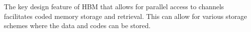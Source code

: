 The key design feature of HBM that allows for parallel access to channels facilitates coded memory storage and retrieval. This can allow for various storage schemes where the data and codes can be stored.



